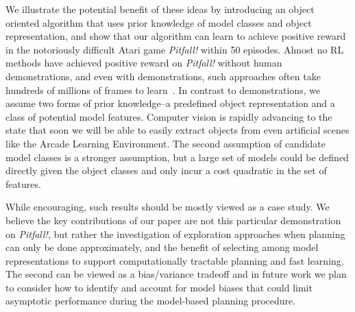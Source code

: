 We illustrate the potential benefit of these ideas by introducing an object oriented algorithm that uses prior knowledge of model classes and object representation, and show that our algorithm can learn to achieve positive reward in the notoriously difficult Atari game \textit{Pitfall!} within 50 episodes. Almost no RL methods have achieved positive reward on \textit{Pitfall!} without human demonstrations, and even with demonstrations, such approaches often take hundreds of millions of frames to learn~\citep{aytar2018playing, hester2017deep}. In contrast to demonstrations, we assume two forms of prior knowledge--a predefined object representation and a class of potential model features. Computer vision is rapidly advancing to the state that soon we will be able to easily extract objects from even artificial scenes like the Arcade Learning Environment.
The second assumption of candidate model classes is a stronger assumption, but a large set of models could be defined directly given the object classes and only incur a cost quadratic in the set of features. %

While encouraging, such results should be mostly viewed as a case study. We believe the key contributions of our paper are not this particular demonstration on \textit{Pitfall!}, but rather the investigation of exploration approaches when planning can only be done approximately, and the benefit of selecting among model representations to support computationally tractable planning and fast learning. The second can be viewed as a bias/variance tradeoff and in future work we plan to consider how to identify and account for model biases that could limit asymptotic performance during the model-based planning procedure.





